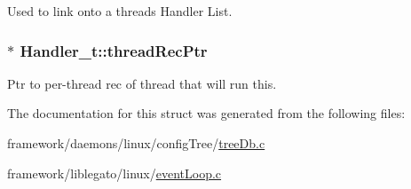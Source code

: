 Used to link onto a thread\textquotesingle{}s Handler List. 

\subsubsection[{\texorpdfstring{thread\+Rec\+Ptr}{threadRecPtr}}]{$\ast$ Handler\+\_\+t\+::thread\+Rec\+Ptr}\hypertarget{struct_handler__t_a471d606790d4d1fa86610deddd0523ff}{}\label{struct_handler__t_a471d606790d4d1fa86610deddd0523ff}


Ptr to per-\/thread rec of thread that will run this. 



The documentation for this struct was generated from the following files\+:\begin{DoxyCompactItemize}
\item 
framework/daemons/linux/config\+Tree/\hyperlink{tree_db_8c}{tree\+Db.\+c}\item 
framework/liblegato/linux/\hyperlink{event_loop_8c}{event\+Loop.\+c}\end{DoxyCompactItemize}
